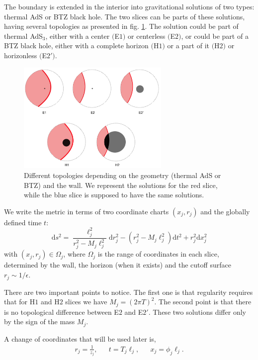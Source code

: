 The boundary is extended in the interior into gravitational solutions of two types: thermal AdS or BTZ black hole. The two slices can be parts of these solutions, having several topologies as presented in fig. \ref{topologies}. The solution could be part of thermal AdS$_3$, either with a center $($E$1)$ or centerless $($E$2)$, or could be part of a BTZ black hole, either with a complete horizon $($H$1)$ or a part of it $($H$2)$ or horizonless $($E$2')$.

\begin{figure}
    \centering
    \includegraphics[width=0.65\textwidth]{figures/phasesred.png}
    \caption{Different topologies depending on the geometry (thermal AdS or BTZ) and the wall. We represent the solutions for the red slice, while the blue slice is supposed to have the same solutions.}
    \label{topologies}
\end{figure}

We write the metric in terms of two coordinate charts $\left(x_j,r_j\right)$ and the globally defined time $t$:
\begin{equation}\label{geometry}
    \text{d}s^2 = \frac{\ell_j^2}{r_j^2-M_j\ell_j^2}\text{d}r_j^2 - \left(r_j^2-M_j\ell_j^2\right)\text{d}t^2+r_j^2\text{d}x_j^2
\end{equation}
with $\left(x_j,r_j\right)\in \Omega_j$, where $\Omega_j$ is the range of coordinates in each slice, determined by the wall, the horizon (when it exists) and the cutoff surface $r_j\sim 1/\epsilon$.

There are two important points to notice. The first one is that regularity requires that for H$1$ and H$2$ slices we have $M_j=\left(2\pi T\right)^2$. The second point is that there is no topological difference between E$2$ and E$2'$. These two solutions differ only by the sign of the mass $M_j$.

A change of coordinates that will be used later is,
\begin{align}\label{change of coord rz}
    r_j=\frac{1}{z_j},         &&           t=T_j\ell_j,          &&        x_j=\phi_j\ell_j.
\end{align}

